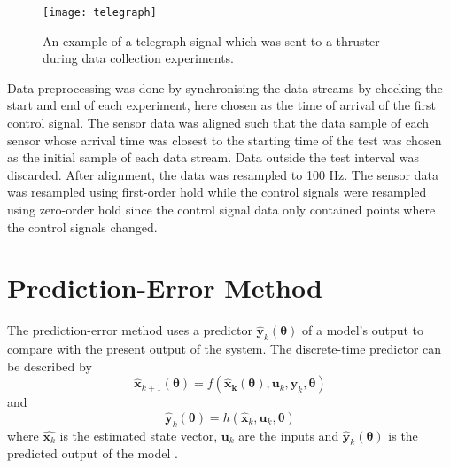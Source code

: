 \begin{figure}[htbp]
\centering
\texttt{[image: telegraph]}
\caption{An example of a telegraph signal which was sent to a thruster during data collection experiments.}
\label{fig:telegraph}
\end{figure}

Data preprocessing was done by synchronising the data streams by checking the start and end of each experiment, here chosen as the time of arrival of the first control signal. The sensor data was aligned such that the data sample of each sensor whose arrival time was closest to the starting time of the test was chosen as the initial sample of each data stream. Data outside the test interval was discarded. After alignment, the data was resampled to 100 Hz. The sensor data was resampled using first-order hold while the control signals were resampled using zero-order hold since the control signal data only contained points where the control signals changed.  


\section{Prediction-Error Method} \label{sec:pem}  
The prediction-error method uses a predictor $\hat{\boldsymbol{y}}_k(\boldsymbol{\theta})$ of a model's output to compare with the present output of the system. The discrete-time predictor can be described by 
\begin{equation}
\hat{\boldsymbol{x}}_{k+1}(\boldsymbol{\theta}) = f(\boldsymbol{\hat{x}_k}(\boldsymbol{\theta}), \boldsymbol{u}_k,\boldsymbol{y}_k, \boldsymbol{\theta})
\end{equation}
and
\begin{equation}
\hat{\boldsymbol{y}}_k(\boldsymbol{\theta}) = h(\hat{\boldsymbol{x}}_k, \boldsymbol{u}_k, \boldsymbol{\theta})
\end{equation}
where $\hat{\boldsymbol{x}_k}$ is the estimated state vector, $\boldsymbol{u}_k$ are the inputs and $\hat{\boldsymbol{y}}_k(\boldsymbol{\theta})$ is the predicted output of the model \citep[p. 13]{Roger}. 

